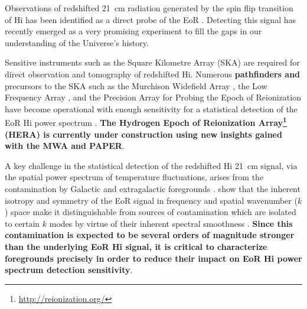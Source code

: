 \documentclass[preprint2,iop,numberedappendix]{emulateapj}
\begin{document}
Observations of redshifted 21~cm radiation generated by the spin flip transition of H{\sc i} has been identified as a direct probe of the EoR \citep{sun72,sco90,mad97,toz00,ili02}. Detecting this signal has recently emerged as a very promising experiment to fill the gaps in our understanding of the Universe's history.  

Sensitive instruments such as the Square Kilometre Array (SKA) are required for direct observation and tomography of redshifted H{\sc i}. Numerous {\bf pathfinders and} precursors to the SKA such as the Murchison Widefield Array \citep[MWA;][]{lon09,tin13,bow13}, the Low Frequency Array \citep[LOFAR;][]{van13}, and the Precision Array for Probing the Epoch of Reionization \citep[PAPER;][]{par10} have become operational with enough sensitivity for a statistical detection of the EoR H{\sc i} power spectrum \citep{bow06,par12a,bea13,dil13,thy13,pob14}. {\bf The Hydrogen Epoch of Reionization Array\footnote{\url{http://reionization.org/}} (HERA) is currently under construction using new insights gained with the MWA and PAPER}.

A key challenge in the statistical detection of the redshifted H{\sc i} 21~cm signal, via the spatial power spectrum of temperature fluctuations, arises from the contamination by Galactic and extragalactic foregrounds \citep[see, e.g.,][]{dim02,zal04,fur06,ali08,ber09,ber10,gho12}. \citet{mor04} show that the inherent isotropy and symmetry of the EoR signal in frequency and spatial wavenumber ($k$) space make it distinguishable from sources of contamination which are isolated to certain $k$ modes by virtue of their inherent spectral smoothness \citep{mor06,bow09,liu11,par12b,dil13,pob13}. {\bf Since this contamination is expected to be several orders of magnitude stronger than the underlying EoR H{\sc i} signal, it is critical to characterize foregrounds precisely in order to reduce their impact on EoR H{\sc i} power spectrum detection sensitivity}. 
\end{document}
